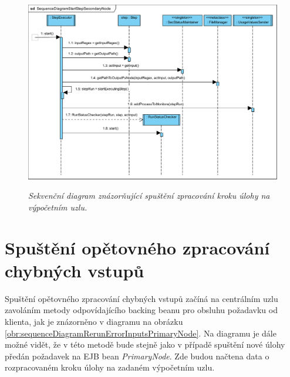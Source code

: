 \begin{figure}[H]
\begin{center}
    \scalebox{0.5}
    {
        \includegraphics{images/SequenceDiagramStartStepSecondaryNode.pdf}
    }
    \caption{\label{obr:sequenceDiagramRunTaskStepStartSecondaryNode} {\it Sekvenční diagram znázorňující spuštění zpracování kroku úlohy na výpočetním uzlu.}}
\end{center}
\end{figure}

\section{Spuštění opětovného zpracování chybných vstupů}
\label{section:RerunTaskOnPrimaryNode}

Spuštění opětovného zpracování chybných vstupů začíná na centrálním uzlu zavoláním metody odpovídajícího backing beanu pro obsluhu požadavku od klienta, jak je znázorněno v diagramu na obrázku \ref{obr:sequenceDiagramRerunErrorInputsPrimaryNode}. Na diagramu je dále možné vidět, že v této metodě bude stejně jako v případě spuštění nové úlohy předán požadavek na EJB bean \textit{PrimaryNode}. Zde budou načtena data o rozpracovaném kroku úlohy na zadaném výpočetním uzlu. 

